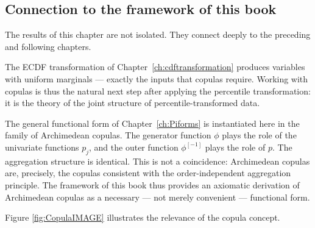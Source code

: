 \subsection{Connection to the framework of this book}

The results of this chapter are not isolated. They connect deeply to the preceding and
following chapters.

The ECDF transformation of Chapter~\ref{ch:cdftransformation} produces
variables with uniform marginals — exactly the inputs that copulas require. Working
with copulas is thus the natural next step after applying the percentile
transformation: it is the theory of the joint structure of percentile-transformed
data.

The general functional form of Chapter~\ref{ch:Piforms} is instantiated here in the
family of Archimedean copulas. The generator function $\phi$ plays the role of the
univariate functions $p_j$, and the outer function $\phi^{[-1]}$ plays the role of
$p$. The aggregation structure is identical. This is not a coincidence: Archimedean
copulas are, precisely, the copulas consistent with the order-independent aggregation
principle. The framework of this book thus provides an axiomatic derivation of
Archimedean copulas as a necessary — not merely convenient — functional form.


Figure \ref{fig:CopulaIMAGE} illustrates the relevance of the copula concept.

